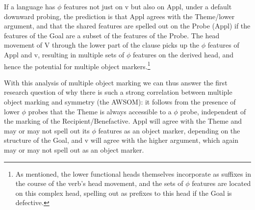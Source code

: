 \documentclass[output=paper
,modfonts
,nonflat]{langsci/langscibook}
\begin{document}
\begin{figure}[!h]
\begin{exe}
\end{exe}
\end{figure}
\newpage \noindent If a language has $\phi$ features not just on v but also on Appl, under a default downward probing, the prediction is that Appl agrees with the Theme/lower argument, and that the shared features are spelled out on the Probe (Appl) if the features of the Goal are a subset of the features of the Probe. The head movement of V through the lower part of the clause picks up the $\phi$ features of Appl and v, resulting in multiple sets of $\phi$ features on the derived head, and hence the potential for multiple object markers.\footnote{As mentioned, the lower functional heads themselves incorporate as suffixes in the course of the verb’s head movement, and the sets of $\phi$ features are located on this complex head, spelling out as prefixes to this head if the Goal is defective.} 

With this analysis of multiple object marking we can thus answer the first research question of why there is such a strong correlation between multiple object marking and symmetry (the AWSOM): it follows from the presence of lower $\phi$ probes that the Theme is always accessible to a $\phi$ probe, independent of the marking of the Recipient/Benefactive. Appl will agree with the Theme and may or may not spell out its $\phi$ features as an object marker, depending on the structure of the Goal, and v will agree with the higher argument, which again may or may not spell out as an object marker. 
\end{document}
